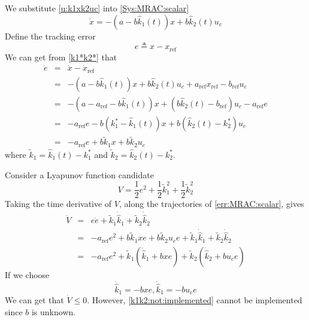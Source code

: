 We substitute \eqref{u:k1xk2uc} into \eqref{Sys:MRAC:scalar}
\begin{equation}
  \dot{x} = - (a - b \hat{k}_1 (t)) x + b \hat{k}_2 (t) u_c
\end{equation}
Define the tracking error
\begin{equation}
  e \triangleq x - x_{\ensuremath{\operatorname{ref}}}
\end{equation}
We can get from \eqref{k1*k2*} that
\begin{eqnarray}
  \dot{e} & = & \dot{x} - \dot{x}_{\ensuremath{\operatorname{ref}}}
  \nonumber\\
  & = & - (a - b \hat{k}_1 (t)) x + b \hat{k}_2 (t) u_c +
  a_{\ensuremath{\operatorname{ref}}} x_{\ensuremath{\operatorname{ref}}} -
  b_{\ensuremath{\operatorname{ref}}} u_c \nonumber\\
  & = & - (a - a_{\ensuremath{\operatorname{ref}}} - b \hat{k}_1 (t)) x + (b
  \hat{k}_2 (t) - b_{\ensuremath{\operatorname{ref}}}) u_c -
  a_{\ensuremath{\operatorname{ref}}} e \nonumber\\
  & = & - a_{\ensuremath{\operatorname{ref}}} e - b (k^{\ast}_1 - \hat{k}_1
  (t)) x + b (\hat{k}_2 (t) - k^{\ast}_2) u_c \nonumber\\
  & = & - a_{\ensuremath{\operatorname{ref}}} e + b \tilde{k}_1 x + b 
  \tilde{k}_2 u_c  \label{err:MRAC:scalar}
\end{eqnarray}
where $\tilde{k}_1 = \hat{k}_1 (t) - k^{\ast}_1$ and $\tilde{k}_2 = \hat{k}_2
(t) - k^{\ast}_2$.

Consider a Lyapunov function candidate
\begin{equation}
  V = \frac{1}{2} e^2 + \frac{1}{2} \tilde{k}^2_1 + \frac{1}{2} \tilde{k}^2_2
\end{equation}
Taking the time derivative of $V$, along the trajectories of
\eqref{err:MRAC:scalar}, gives
\begin{eqnarray}
  \dot{V} & = & e  \dot{e} + \tilde{k} _1 \dot{\hat{k}}_1 + \tilde{k} _2
  \dot{\hat{k}}_2 \nonumber\\
  & = & - a_{\ensuremath{\operatorname{ref}}} e^2 + b \tilde{k} _1 x  e + b
  \tilde{k} _2 u_c e + \tilde{k} _1 \dot{\hat{k}}_1 + \tilde{k} _2
  \dot{\hat{k}}_2 \nonumber\\
  & = & - a_{\ensuremath{\operatorname{ref}}} e^2 + \tilde{k} _1
  (\dot{\hat{k}}_1 + b  x  e) + \tilde{k} _2 (\dot{\hat{k}}_2 + b  u_c e) 
\end{eqnarray}
If we choose
\begin{equation}
  \dot{\hat{k}}_1 = - b  x  e, \dot{\hat{k}}_1 = - b  u_c e
  \label{k1k2:not:implemented}
\end{equation}
We can get that $\dot{V} \leq 0$. However, \eqref{k1k2:not:implemented} cannot
be implemented since $b$ is unknown.

